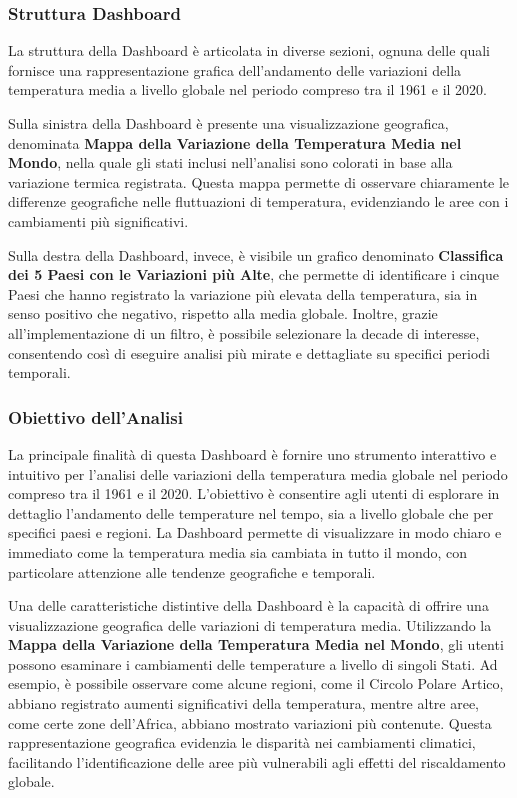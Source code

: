\subsubsection{Struttura Dashboard}
La struttura della Dashboard è articolata in diverse sezioni, ognuna delle quali fornisce una rappresentazione grafica dell'andamento delle variazioni della temperatura media a livello globale nel periodo compreso tra il 1961 e il 2020.

Sulla sinistra della Dashboard è presente una visualizzazione geografica, denominata \textbf{Mappa della Variazione della Temperatura Media nel Mondo}, nella quale gli stati inclusi nell'analisi sono colorati in base alla variazione termica registrata. Questa mappa permette di osservare chiaramente le differenze geografiche nelle fluttuazioni di temperatura, evidenziando le aree con i cambiamenti più significativi.

Sulla destra della Dashboard, invece, è visibile un grafico denominato \textbf{Classifica dei 5 Paesi con le Variazioni più Alte}, che permette di identificare i cinque Paesi che hanno registrato la variazione più elevata della temperatura, sia in senso positivo che negativo, rispetto alla media globale. Inoltre, grazie all'implementazione di un filtro, è possibile selezionare la decade di interesse, consentendo così di eseguire analisi più mirate e dettagliate su specifici periodi temporali.

\subsubsection{Obiettivo dell'Analisi}
La principale finalità di questa Dashboard è fornire uno strumento interattivo e intuitivo per l'analisi delle variazioni della temperatura media globale nel periodo compreso tra il 1961 e il 2020. L'obiettivo è consentire agli utenti di esplorare in dettaglio l'andamento delle temperature nel tempo, sia a livello globale che per specifici paesi e regioni. La Dashboard permette di visualizzare in modo chiaro e immediato come la temperatura media sia cambiata in tutto il mondo, con particolare attenzione alle tendenze geografiche e temporali.

Una delle caratteristiche distintive della Dashboard è la capacità di offrire una visualizzazione geografica delle variazioni di temperatura media. Utilizzando la \textbf{Mappa della Variazione della Temperatura Media nel Mondo}, gli utenti possono esaminare i cambiamenti delle temperature a livello di singoli Stati. Ad esempio, è possibile osservare come alcune regioni, come il Circolo Polare Artico, abbiano registrato aumenti significativi della temperatura, mentre altre aree, come certe zone dell'Africa, abbiano mostrato variazioni più contenute. Questa rappresentazione geografica evidenzia le disparità nei cambiamenti climatici, facilitando l'identificazione delle aree più vulnerabili agli effetti del riscaldamento globale.

